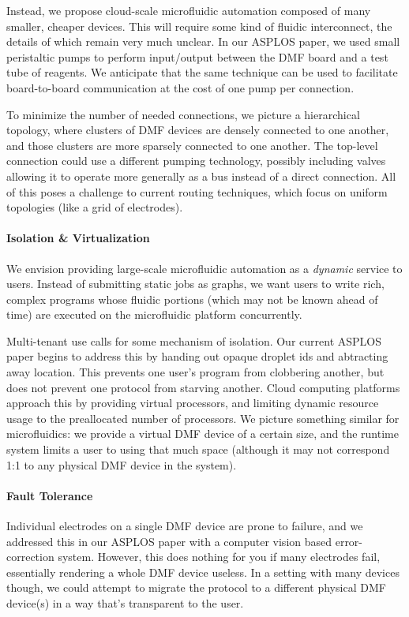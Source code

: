 \documentclass[sigplan, screen, nonacm]{acmart}
\begin{document}
Instead, we propose cloud-scale microfluidic automation composed of many smaller, cheaper devices.
This will require some kind of fluidic interconnect, the details of which remain very much unclear.
In our ASPLOS paper, we used small peristaltic pumps to perform input/output between the DMF board and a test tube of reagents.
We anticipate that the same technique can be used to facilitate board-to-board communication at the cost of one pump per connection.

To minimize the number of needed connections, we picture a hierarchical topology, where clusters of DMF devices are densely connected to one another, and those clusters are more sparsely connected to one another.
The top-level connection could use a different pumping technology, possibly including valves allowing it to operate more generally as a bus instead of a direct connection.
All of this poses a challenge to current routing techniques, which focus on uniform topologies (like a grid of electrodes).

\paragraph{Isolation \& Virtualization}
We envision providing large-scale microfluidic automation as a \emph{dynamic} service to users.
Instead of submitting static jobs as graphs, we want users to write rich, complex programs whose fluidic portions (which may not be known ahead of time) are executed on the microfluidic platform concurrently.

Multi-tenant use calls for some mechanism of isolation.
Our current ASPLOS paper begins to address this by handing out opaque droplet ids and abtracting away location.
This prevents one user's program from clobbering another, but does not prevent one protocol from starving another.
Cloud computing platforms approach this by providing virtual processors, and limiting dynamic resource usage to the preallocated number of processors.
We picture something similar for microfluidics: we provide a virtual DMF device of a certain size\footnotemark, and the runtime system limits a user to using that much space (although it may not correspond 1:1 to any physical DMF device in the system).

\paragraph{Fault Tolerance}
Individual electrodes on a single DMF device are prone to failure, and we addressed this in our ASPLOS paper with a computer vision based error-correction system.
However, this does nothing for you if many electrodes fail, essentially rendering a whole DMF device useless.
In a setting with many devices though, we could attempt to migrate the protocol to a different physical DMF device(s) in a way that's transparent to the user.
\end{document}
